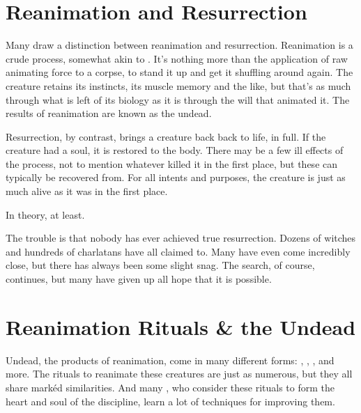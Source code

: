 
\section{Reanimation and Resurrection}

Many  draw a distinction between reanimation and resurrection.
Reanimation is a crude process, somewhat akin to .
It's nothing more than the application of raw animating force to a corpse, to stand it up and get it shuffling around again.
The creature retains its instincts, its muscle memory and the like, but that's as much through what is left of its biology as it is through the will that animated it.
The results of reanimation are known as the undead.

Resurrection, by contrast, brings a creature back back to life, in full.
If the creature had a soul, it is restored to the body.
There may be a few ill effects of the process, not to mention whatever killed it in the first place, but these can typically be recovered from.
For all intents and purposes, the creature is just as much alive as it was in the first place.

In theory, at least.

The trouble is that nobody has ever achieved true resurrection.
Dozens of witches and hundreds of charlatans have all claimed to.
Many have even come incredibly close, but there has always been some slight snag.
The search, of course, continues, but many have given up all hope that it is possible.

\section{Reanimation Rituals \& the Undead}

Undead, the products of reanimation, come in many different forms: , , , and more.
The rituals to reanimate these creatures are just as numerous, but they all share mark{\'e}d similarities.
And many , who consider these rituals to form the heart and soul of the discipline, learn a lot of techniques for improving them.

